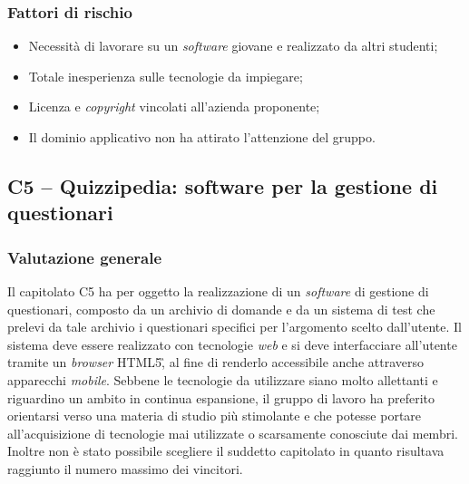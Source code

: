 \subsubsection{Fattori di rischio}
\begin{itemize}
\item Necessità di lavorare su un \textit{software} giovane e realizzato da altri studenti;
\item Totale inesperienza sulle tecnologie da impiegare;
\item Licenza e \textit{copyright} vincolati all'azienda proponente;
\item Il dominio applicativo non ha attirato l'attenzione del gruppo.
\end{itemize}

\subsection{C5 – Quizzipedia: software per la gestione di questionari}
\subsubsection{Valutazione generale}
Il capitolato C5 ha per oggetto la realizzazione di un \textit{software} di gestione di questionari, composto da un archivio di domande e da un sistema di test che prelevi da tale archivio i questionari specifici per l'argomento scelto dall'utente. Il sistema deve essere realizzato con tecnologie \textit{web} e si deve interfacciare all'utente tramite un \textit{browser} HTML5\G, al fine di renderlo accessibile anche attraverso apparecchi \textit{mobile}. Sebbene le tecnologie da utilizzare siano molto allettanti e riguardino un ambito in continua espansione, il gruppo di lavoro ha preferito orientarsi verso una materia di studio più stimolante e che potesse portare all'acquisizione di tecnologie mai utilizzate o scarsamente conosciute dai membri. Inoltre non è stato possibile scegliere il suddetto capitolato in quanto risultava raggiunto il numero massimo dei vincitori.



